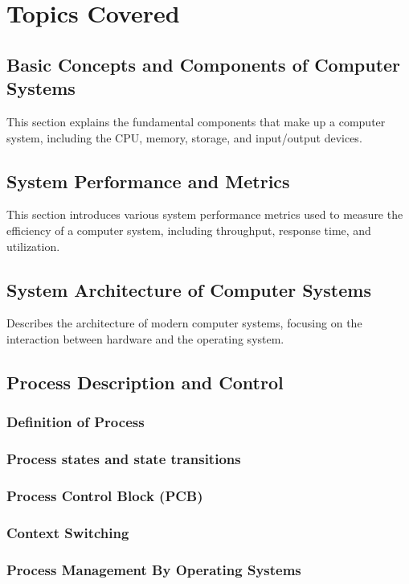 \documentclass[12pt]{article}
\begin{document}
\section{Topics Covered}

\subsection{Basic Concepts and Components of Computer Systems}
This section explains the fundamental components that make up a computer system, including the CPU, memory, storage, and input/output devices.

\subsection{System Performance and Metrics}
This section introduces various system performance metrics used to measure the efficiency of a computer system, including throughput, response time, and utilization.

\subsection{System Architecture of Computer Systems}
Describes the architecture of modern computer systems, focusing on the interaction between hardware and the operating system.

\subsection{Process Description and Control}
\subsubsection{Definition of Process}
\subsubsection{Process states and state transitions}
\subsubsection{Process Control Block (PCB)}
\subsubsection{Context Switching}


\subsubsection{Process Management By Operating Systems}
\end{document}
